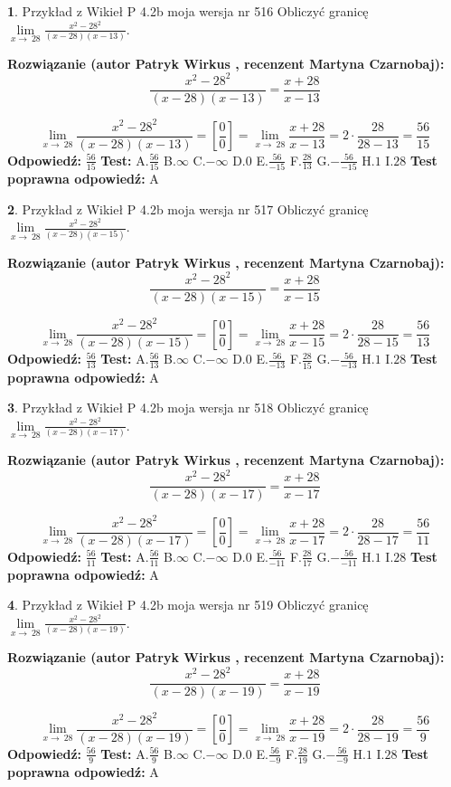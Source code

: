 \documentclass[12pt, a4paper]{article}
\theoremstyle{definition} %
\newtheorem{zad}{}
\newcommand{\zadStart}[1]{\begin{zad}#1\newline}
\newcommand{\zadStop}{\end{zad}}
\newcommand{\rozwStart}[2]{\noindent \textbf{Rozwiązanie (autor #1 , recenzent #2): }\newline}
\newcommand{\rozwStop}{\newline}
\newcommand{\odpStart}{\noindent \textbf{Odpowiedź:}\newline}
\newcommand{\odpStop}{\newline}
\newcommand{\testStart}{\noindent \textbf{Test:}\newline}
\newcommand{\testStop}{\newline}
\newcommand{\kluczStart}{\noindent \textbf{Test poprawna odpowiedź:}\newline}
\newcommand{\kluczStop}{\newline}
\begin{document}
\zadStart{Przykład z Wikieł P 4.2b moja wersja nr 516}
Obliczyć granicę $\lim\limits_{x\to\ 28}\frac{x^{2}-28^{2}}{(x-28)(x-13)}$.
\zadStop
\rozwStart{Patryk Wirkus}{Martyna Czarnobaj}
$$\frac{x^{2}-28^{2}}{(x-28)(x-13)}=\frac{x+28}{x-13}$$

$$\lim\limits_{x\to\ 28}\frac{x^{2}-28^{2}}{(x-28)(x-13)}=[\frac{0}{0}]=\lim\limits_{x\to\ 28}\frac{x+28}{x-13}=2 \cdot \frac{28}{28-13} = \frac{56}{15}$$
\rozwStop
\odpStart
$\frac{56}{15}$
\odpStop
\testStart
A.$\frac{56}{15}$
B.$\infty$
C.$-\infty$
D.$0$
E.$\frac{56}{-15}$
F.$\frac{28}{13}$
G.$-\frac{56}{-15}$
H.$1$
I.$28$
\testStop
\kluczStart
A
\kluczStop



\zadStart{Przykład z Wikieł P 4.2b moja wersja nr 517}
Obliczyć granicę $\lim\limits_{x\to\ 28}\frac{x^{2}-28^{2}}{(x-28)(x-15)}$.
\zadStop
\rozwStart{Patryk Wirkus}{Martyna Czarnobaj}
$$\frac{x^{2}-28^{2}}{(x-28)(x-15)}=\frac{x+28}{x-15}$$

$$\lim\limits_{x\to\ 28}\frac{x^{2}-28^{2}}{(x-28)(x-15)}=[\frac{0}{0}]=\lim\limits_{x\to\ 28}\frac{x+28}{x-15}=2 \cdot \frac{28}{28-15} = \frac{56}{13}$$
\rozwStop
\odpStart
$\frac{56}{13}$
\odpStop
\testStart
A.$\frac{56}{13}$
B.$\infty$
C.$-\infty$
D.$0$
E.$\frac{56}{-13}$
F.$\frac{28}{15}$
G.$-\frac{56}{-13}$
H.$1$
I.$28$
\testStop
\kluczStart
A
\kluczStop



\zadStart{Przykład z Wikieł P 4.2b moja wersja nr 518}
Obliczyć granicę $\lim\limits_{x\to\ 28}\frac{x^{2}-28^{2}}{(x-28)(x-17)}$.
\zadStop
\rozwStart{Patryk Wirkus}{Martyna Czarnobaj}
$$\frac{x^{2}-28^{2}}{(x-28)(x-17)}=\frac{x+28}{x-17}$$

$$\lim\limits_{x\to\ 28}\frac{x^{2}-28^{2}}{(x-28)(x-17)}=[\frac{0}{0}]=\lim\limits_{x\to\ 28}\frac{x+28}{x-17}=2 \cdot \frac{28}{28-17} = \frac{56}{11}$$
\rozwStop
\odpStart
$\frac{56}{11}$
\odpStop
\testStart
A.$\frac{56}{11}$
B.$\infty$
C.$-\infty$
D.$0$
E.$\frac{56}{-11}$
F.$\frac{28}{17}$
G.$-\frac{56}{-11}$
H.$1$
I.$28$
\testStop
\kluczStart
A
\kluczStop



\zadStart{Przykład z Wikieł P 4.2b moja wersja nr 519}
Obliczyć granicę $\lim\limits_{x\to\ 28}\frac{x^{2}-28^{2}}{(x-28)(x-19)}$.
\zadStop
\rozwStart{Patryk Wirkus}{Martyna Czarnobaj}
$$\frac{x^{2}-28^{2}}{(x-28)(x-19)}=\frac{x+28}{x-19}$$

$$\lim\limits_{x\to\ 28}\frac{x^{2}-28^{2}}{(x-28)(x-19)}=[\frac{0}{0}]=\lim\limits_{x\to\ 28}\frac{x+28}{x-19}=2 \cdot \frac{28}{28-19} = \frac{56}{9}$$
\rozwStop
\odpStart
$\frac{56}{9}$
\odpStop
\testStart
A.$\frac{56}{9}$
B.$\infty$
C.$-\infty$
D.$0$
E.$\frac{56}{-9}$
F.$\frac{28}{19}$
G.$-\frac{56}{-9}$
H.$1$
I.$28$
\testStop
\kluczStart
A
\kluczStop
\end{document}
